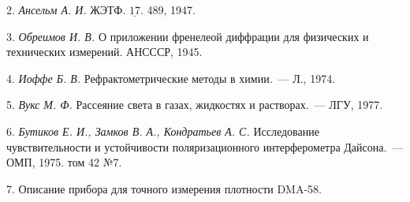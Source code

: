 2. {\itshape Ансельм А. И.} ЖЭТФ. $\underline{17}$. 489, 1947.

3. {\itshape Обреимов И. В.} О приложении френелеой диффрации для физических и технических измерений. АНСССР, 1945.

4. {\itshape Иоффе Б. В.} Рефрактометрические методы в химии.~--- Л., 1974.

5. {\itshape Вукс М. Ф.} Рассеяние света в газах, жидкостях и растворах.~--- ЛГУ, 1977.

6. {\itshape Бутиков Е. И., Замков В. А., Кондратьев А. С.} Исследование чувствительности и устойчивости
поляризационного интерферометра Дайсона.~--- ОМП, 1975. том 42 №7.

7. Описание прибора для точного измерения плотности DMA-58.

